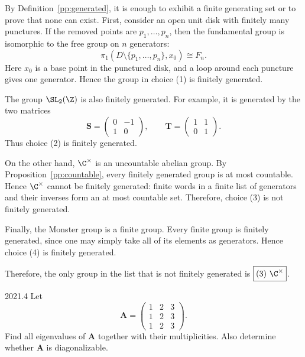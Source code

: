     \begin{solution}
        By Definition~\ref{pp:generated},
        it is enough to exhibit a finite generating set or to prove that none can
        exist. First, consider an open unit disk with finitely many punctures. If
        the removed points are $p_1,\dots,p_n$, then the fundamental group is
        isomorphic to the free group on $n$ generators:
        \[
            \pi_1\left(D\setminus\{p_1,\dots,p_n\},x_0\right)\cong F_n.
        \]
        Here $x_0$ is a base point in the punctured disk, and a loop around each puncture gives one generator. Hence the group in choice (1) is finitely generated.

        The group $\SL_2(\Z)$ is also finitely generated. For example, it is generated by the two
        matrices
        \[
            \mathbf{S}=
            \begin{pmatrix}
                0 & -1 \\
                1 & 0
            \end{pmatrix},
            \qquad
            \mathbf{T}=
            \begin{pmatrix}
                1 & 1 \\
                0 & 1
            \end{pmatrix}.
        \]
        Thus choice (2) is finitely generated.

        On the other hand, $\C^{\times}$ is an uncountable abelian group. By Proposition~\ref{pp:countable}, every finitely generated group is at most countable. Hence
        $\C^{\times}$ cannot be finitely generated: finite words in a finite list of generators and their inverses form an at most countable set. Therefore, choice (3) is
        not finitely generated.

        Finally, the Monster group is a finite group. Every finite group is finitely generated,
        since one may simply take all of its elements as generators. Hence choice (4) is finitely
        generated.

        Therefore, the only group in the list that is not finitely generated is $\boxed{(3)\
        \C^{\times}}$.
    \end{solution}

    \begin{pastproblem}{2021.4}
        Let
        \[
            \mathbf{A}
            =
            \begin{pmatrix}
                1 & 2 & 3 \\
                1 & 2 & 3 \\
                1 & 2 & 3
            \end{pmatrix}.
        \]
        Find all eigenvalues of $\mathbf{A}$ together with their multiplicities. Also determine
        whether $\mathbf{A}$ is diagonalizable.
    \end{pastproblem}

